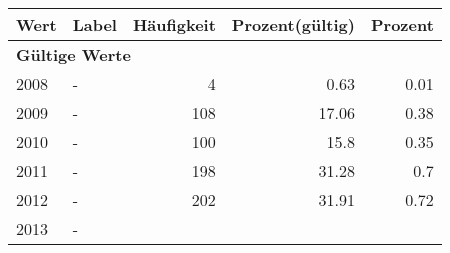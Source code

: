      \begin{longtable}{lXrrr}
     \toprule
     \textbf{Wert} & \textbf{Label} & \textbf{Häufigkeit} & \textbf{Prozent(gültig)} & \textbf{Prozent} \\
     \endhead
     \midrule
     \multicolumn{5}{l}{\textbf{Gültige Werte}}\\

     2008 &
     \multicolumn{1}{X}{ -  } &


       \num{4} &
       \num[round-mode=places,round-precision=2]{0.63} &
         \num[round-mode=places,round-precision=2]{0.01} \\

     2009 &
     \multicolumn{1}{X}{ -  } &


       \num{108} &
       \num[round-mode=places,round-precision=2]{17.06} &
         \num[round-mode=places,round-precision=2]{0.38} \\

     2010 &
     \multicolumn{1}{X}{ -  } &


       \num{100} &
       \num[round-mode=places,round-precision=2]{15.8} &
         \num[round-mode=places,round-precision=2]{0.35} \\

     2011 &
     \multicolumn{1}{X}{ -  } &


       \num{198} &
       \num[round-mode=places,round-precision=2]{31.28} &
         \num[round-mode=places,round-precision=2]{0.7} \\

     2012 &
     \multicolumn{1}{X}{ -  } &


       \num{202} &
       \num[round-mode=places,round-precision=2]{31.91} &
         \num[round-mode=places,round-precision=2]{0.72} \\

     2013 &
     \multicolumn{1}{X}{ -  } &



\end{longtable}
